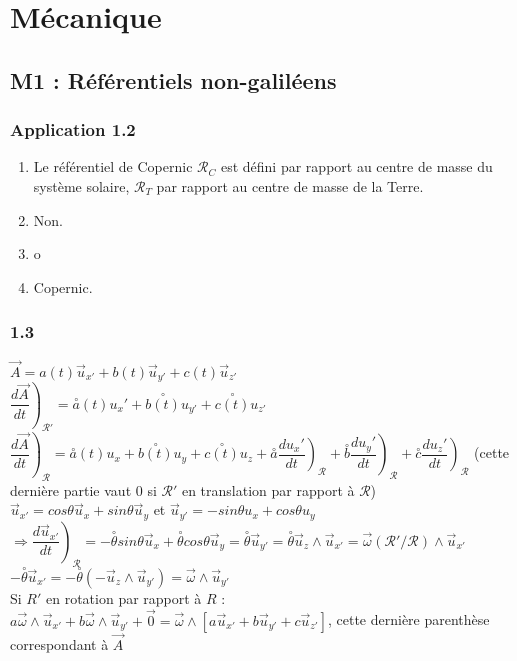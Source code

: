 \documentclass[a4paper,12pt]{book}
\begin{document}
\tableofcontents

\chapter{Mécanique}
\section{M1 :  Référentiels non-galiléens}
\subsection{Application 1.2}
\begin{enumerate}
\item Le référentiel de Copernic $\mathcal{R}_C$ est défini par rapport au centre de masse du système solaire, $\mathcal{R}_T$ par rapport au centre de masse de la Terre.
\item Non.
\item o
\item Copernic.
\end{enumerate}

\subsection{1.3}
$\vec{A} = a(t)\vec{u}_{x'} + b(t)\vec{u}_{y'} + c(t)\vec{u}_{z'}$
\\ $\left.\dfrac{d\vec{A}}{dt}\right)_{\mathcal{R}'} = \overset{\circ}{a}(t)u_x' + \overset{\circ}{b(t)}u_{y'} + \overset{\circ}{c(t)}u_{z'}$
\\ $\left.\dfrac{d\vec{A}}{dt}\right)_{\mathcal{R}} = \overset{\circ}{a}(t)u_x + \overset{\circ}{b(t)}u_y + \overset{\circ}{c(t)}u_z + \left.\overset{\circ}{a}\dfrac{du_x'}{dt}\right)_{\mathcal{R}} + \left.\overset{\circ}{b}\dfrac{du_y'}{dt}\right)_{\mathcal{R}} + \left.\overset{\circ}{c}\dfrac{du_z'}{dt}\right)_{\mathcal{R}}$ (cette dernière partie vaut 0 si $\mathcal{R}'$ en translation par rapport à $\mathcal{R}$)
\\ $\vec{u}_{x'} = cos\theta \vec{u}_x + sin\theta \vec{u}_y$ et $\vec{u}_{y'} = -sin\theta u_x + cos\theta u_y$
\\ $\Rightarrow \left.\dfrac{d\vec{u}_{x'}}{dt}\right)_{\mathcal{R}} = -\overset{\circ}{\theta} sin\theta \vec{u}_x + \overset{\circ}{\theta} cos\theta \vec{u}_y = \overset{\circ}{\theta} \vec{u}_{y'} = \overset{\circ}{\theta} \vec{u}_z\wedge \vec{u}_{x'} = \vec{\omega}(\mathcal{R}'/\mathcal{R})\wedge \vec{u}_{x'}$
\\$ -\overset{\circ}{\theta} \vec{u}_{x'}= -\overset{\circ}{\theta} (-\vec{u}_z\wedge \vec{u}_{y'}) = \vec{\omega}\wedge \vec{u}_{y'}$
\\ Si $R'$ en rotation par rapport à $R$ : $a\vec{\omega}\wedge \vec{u}_{x'} + b\vec{\omega}\wedge \vec{u}_{y'} + \vec{0} = \vec{\omega}\wedge\left[a\vec{u}_{x'}+b\vec{u}_{y'} + c\vec{u}_{z'}\right]$, cette dernière parenthèse correspondant à $\vec{A}$
\end{document}
